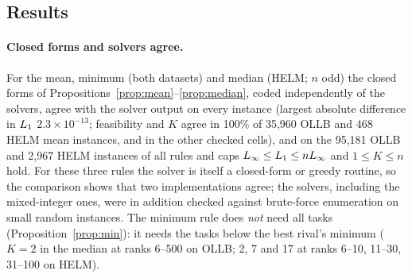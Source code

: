 \subsection{Results}
\label{sec:results}
\paragraph{Closed forms and solvers agree.}
For the mean, minimum (both datasets) and median (HELM; $n$ odd) the closed forms of Propositions~\ref{prop:mean}--\ref{prop:median}, coded independently of the solvers, agree with the solver output on every instance (largest absolute difference in $\LL$ $2.3\times10^{-13}$; feasibility and $K$ agree in 100\% of 35{,}960 OLLB and 468 HELM mean instances, and in the other checked cells), and on the 95{,}181 OLLB and 2{,}967 HELM instances of all rules and caps $L_\infty\le L_1\le nL_\infty$ and $1\le K\le n$ hold. For these three rules the solver is itself a closed-form or greedy routine, so the comparison shows that two implementations agree; the solvers, including the mixed-integer ones, were in addition checked against brute-force enumeration on small random instances. The minimum rule does \emph{not} need all tasks (Proposition~\ref{prop:min}): it needs the tasks below the best rival's minimum ($K=2$ in the median at ranks 6--500 on OLLB; 2, 7 and 17 at ranks 6--10, 11--30, 31--100 on HELM).

\begin{table}[t]
\centering\small
\caption{Median minimum $\LL$ (total points) [95\% bootstrap interval] over the \emph{feasible} targets of each rank group, per rule and cap; ``$a/b$ feas.'' means that $a$ of the group's $b$ targets can become first under the cap (cells without it: all can), ``all inf.'' that none can; $^\dagger$: median over fewer than five feasible targets, its interval is unreliable. The targets are all models of the leaderboard (a census), so the interval shows how much the median depends on which models are in the group, not sampling from a larger population; medians of different caps are over different feasible subsets. The group $>$500 is 89\% of the targets; under the binding caps it is almost wholly infeasible. Ordinal rules ($^*$) use the stratified sample (smaller $b$). Open LLM Leaderboard; the corresponding table for $K$ and for HELM MMLU are in Appendix~\ref{app:tables}.}
\label{tab:l1ollb}
\resizebox{\linewidth}{!}{}
\end{table}

